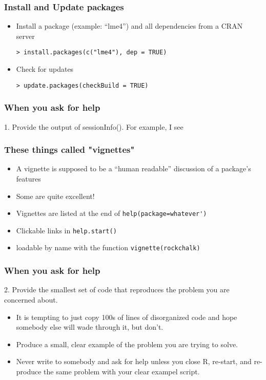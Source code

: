 \documentclass[11pt,canadian,english]{beamer}
\def\lyxframeend{} %
\begin{document}
\lyxframeend{}

\begin{frame}[containsverbatim]
\frametitle{Install and Update packages}
\begin{itemize}
\item Install a package (example: ``lme4'') and all dependencies from
a CRAN server


\begin{lstlisting}
> install.packages(c("lme4"), dep = TRUE)
\end{lstlisting}


\item Check for updates


\begin{lstlisting}
> update.packages(checkBuild = TRUE)
\end{lstlisting}


\end{itemize}
\end{frame}

\begin{frame}[containsverbatim]
\frametitle{When you ask for help}

1. Provide the output of sessionInfo(). For example, I see



\end{frame}

\begin{frame}[containsverbatim]
\frametitle{These things called "vignettes"}
\begin{itemize}
\item A vignette is supposed to be a ``human readable'' discussion of
a package's features
\item Some are quite excellent!
\item Vignettes are listed at the end of \lstinline!help(package=whatever')!
\item Clickable links in \lstinline!help.start()!
\item loadable by name with the function \lstinline!vignette(rockchalk)!
\end{itemize}
\end{frame}

\begin{frame}[containsverbatim]
\frametitle{When you ask for help}

2. Provide the smallest set of code that reproduces the problem you
are concerned about. 
\begin{itemize}
\item It is tempting to just copy 100s of lines of disorganized code and
hope somebody else will wade through it, but don't.
\item Produce a small, clear example of the problem you are trying to solve. 
\item Never write to somebody and ask for help unless you close R, re-start,
and re-produce the same problem with your clear exampel script.
\end{itemize}
\end{frame}
\end{document}
